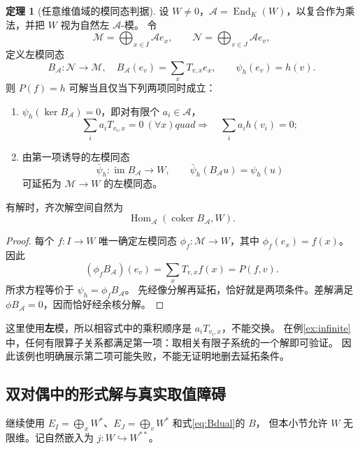 \documentclass[UTF8,11pt,a4paper]{ctexart}
\theoremstyle{definition}
\newtheorem{theorem}{定理}[section]
\newcommand{\Hom}{\operatorname{Hom}}
\newcommand{\End}{\operatorname{End}}
\newcommand{\im}{\operatorname{im}}
\newcommand{\coker}{\operatorname{coker}}
\newcommand{\calA}{\mathcal A}
\newcommand{\calM}{\mathcal M}
\newcommand{\calN}{\mathcal N}
\begin{document}
\begin{theorem}[任意维值域的模同态判据]\label{thm:module}
设 $W\ne0$，$\calA=\End_K(W)$，以复合作为乘法，并把 $W$ 视为自然左 $\calA$-模。
令
\[
 \calM=\bigoplus_{x\in I}\calA e_x,\qquad
 \calN=\bigoplus_{v\in J}\calA e_v,
\]
定义左模同态
\[
 B_{\calA}:\calN\to\calM,\quad B_{\calA}(e_v)=\sum_x T_{v,x}e_x,
 \qquad\psi_h(e_v)=h(v).
\]
则 $P(f)=h$ 可解当且仅当下列两项同时成立：
\begin{enumerate}
\item $\psi_h(\ker B_{\calA})=0$，即对有限个 $a_i\in\calA$，
\[
 \sum_i a_iT_{v_i,x}=0\ (\forall x)quad\Longrightarrow\quad
 \sum_i a_i h(v_i)=0;
\]
\item 由第一项诱导的左模同态
\[
 \bar\psi_h:\im B_{\calA}\to W,\qquad
 \bar\psi_h(B_{\calA}u)=\psi_h(u)
\]
可延拓为 $\calM\to W$ 的左模同态。
\end{enumerate}
有解时，齐次解空间自然为
\[
 \Hom_{\calA}(\coker B_{\calA},W).
\]
\end{theorem}
\begin{proof}
每个 $f:I\to W$ 唯一确定左模同态
$\phi_f:\calM\to W$，其中 $\phi_f(e_x)=f(x)$。
因此
\[
 (\phi_f B_{\calA})(e_v)=\sum_xT_{v,x}f(x)=P(f,v).
\]
所求方程等价于 $\psi_h=\phi_fB_{\calA}$。
先经像分解再延拓，恰好就是两项条件。差解满足 $\phi B_{\calA}=0$，因而恰好经余核分解。
\end{proof}
这里使用\textbf{左}模，所以相容式中的乘积顺序是 $a_iT_{v_i,x}$，不能交换。
在例\ref{ex:infinite}中，任何有限算子关系都满足第一项：取相关有限子系统的一个解即可验证。
因此该例也明确展示第二项可能失败，不能无证明地删去延拓条件。

\subsection{双对偶中的形式解与真实取值障碍}
继续使用 $E_I=\bigoplus_xW^*$、$E_J=\bigoplus_vW^*$ 和式\eqref{eq:Bdual}的 $B$，
但本小节允许 $W$ 无限维。记自然嵌入为 $j:W\hookrightarrow W^{**}$。
\end{document}
